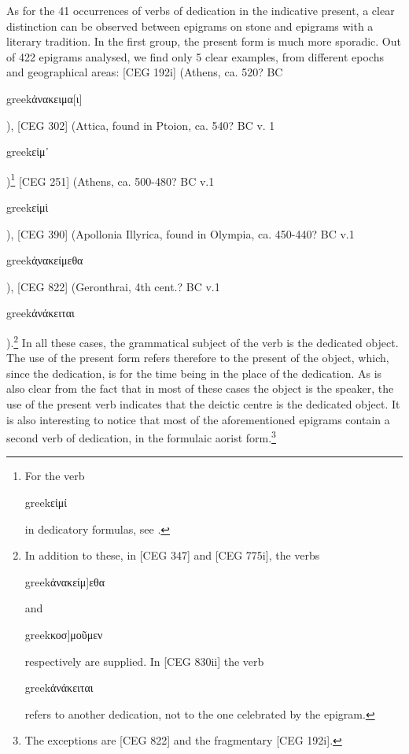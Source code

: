 \documentclass[amsthm,ebook]{saparticle}
\begin{document}
As for the 41 occurrences of verbs of dedication in the indicative present, a clear distinction can be observed between
epigrams on stone and epigrams with a literary tradition. In the first group, the present form is much more sporadic.
Out of 422 epigrams analysed, we find only 5 clear examples, from different epochs and geographical areas: [CEG 192i]
(Athens, ca. 520? BC \begin{otherlanguage*}{greek}ἀνακειμα[ι]\end{otherlanguage*}), [CEG 302] (Attica, found in Ptoion, ca. 540? BC v. 1
\begin{otherlanguage*}{greek}εἰμ᾿\end{otherlanguage*})\footnote{ For the verb \begin{otherlanguage*}{greek}εἰμί\end{otherlanguage*} in dedicatory formulas, see \citet[59f.]{lazzarini_formule_1976}.} [CEG
251] (Athens, ca. 500-480? BC v.1 \begin{otherlanguage*}{greek}εἰμὶ\end{otherlanguage*}), [CEG 390] (Apollonia Illyrica, found in Olympia, ca. 450-440? BC
v.1 \begin{otherlanguage*}{greek}ἀ̣νακείμεθα\end{otherlanguage*}), [CEG 822] (Geronthrai, 4th cent.? BC v.1
\begin{otherlanguage*}{greek}ἀνάκειται\end{otherlanguage*}).\footnote{ In addition to these, in [CEG 347] and [CEG 775i], the verbs
\begin{otherlanguage*}{greek}ἀνακείμ]εθα\end{otherlanguage*} and \begin{otherlanguage*}{greek}κοσ]μοῦμεν\end{otherlanguage*} respectively are supplied. In [CEG 830ii] the verb
\begin{otherlanguage*}{greek}ἀνάκειται\end{otherlanguage*} refers to another dedication, not to the one celebrated by the epigram.} In all these cases,
the grammatical subject of the verb is the dedicated object. The use of the present form refers therefore to the
present of the object, which, since the dedication, is for the time being in the place of the dedication. As is also
clear from the fact that in most of these cases the object is the speaker, the use of the present verb indicates that
the deictic centre is the dedicated object. It is also interesting to notice that most of the aforementioned epigrams
contain a second verb of dedication, in the formulaic aorist form.\footnote{ The exceptions are [CEG 822] and the
fragmentary [CEG 192i].} 
\end{document}
